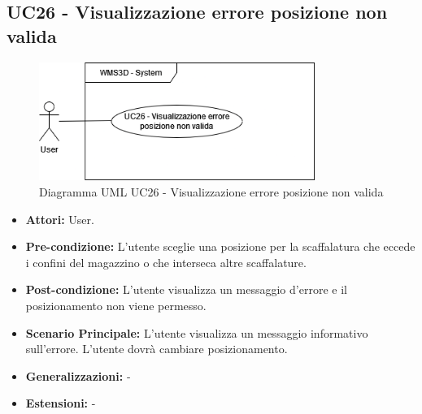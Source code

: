 \subsection{UC26 - Visualizzazione errore posizione non valida}
\begin{figure}[H]
  \centering
  \includegraphics[width=0.8\textwidth]{UC_diagrams_21-26/UC26.drawio.png}
   \caption{Diagramma UML UC26 - Visualizzazione errore posizione non valida}
\end{figure}
\begin{itemize}
    \item \textbf{Attori:} User.
    \item \textbf{Pre-condizione:}  L'utente sceglie una posizione per la scaffalatura che eccede i confini del magazzino o che interseca altre scaffalature.
    \item \textbf{Post-condizione:} L'utente visualizza un messaggio d'errore e il posizionamento non viene permesso.
    \item \textbf{Scenario Principale:} L'utente visualizza un messaggio informativo sull'errore. L'utente dovrà cambiare posizionamento.
    \item \textbf{Generalizzazioni:} -
    \item \textbf{Estensioni:} -
\end{itemize}